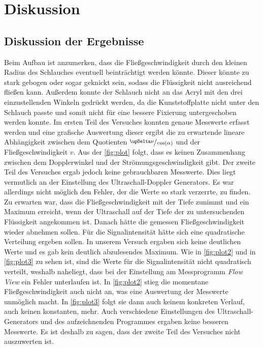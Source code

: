 \section{Diskussion}
\label{sec:Diskussion}

\subsection{Diskussion der Ergebnisse}
\label{subsec:diskErg}
Beim Aufbau ist anzumerken, dass die Fließgeschwindigkeit durch den kleinen Radius des Schlauches eventuell beinträchtigt werden könnte.
Dieser könnte zu stark gebogen oder sogar geknickt sein, sodass die Flüssigkeit nicht ausreichend fließen kann.
Außerdem konnte der Schlauch nicht an das Acryl mit den drei einzustellenden Winkeln gedrückt werden, da die Kunststoffplatte nicht 
unter den Schlauch passte und somit nicht für eine bessere Fixierung untergeschoben werden konnte.\newline
Im ersten Teil des Versuches konnten genaue Messwerte erfasst werden und eine grafische Auswertung dieser ergibt die zu erwartende lineare Abhängigkeit
zwischen dem Quotienten $\sfrac{\upDelta\nu}{\cos(\alpha)}$ und der Fließgeschwindigkeit $v$.
Aus der \autoref{fig:plot} folgt, dass es keinen Zusammenhang zwischen dem Dopplerwinkel und der Strömungsgeschwindigkeit gibt.\newline
Der zweite Teil des Versuches ergab jedoch keine gebrauchbaren Messwerte. Dies liegt vermutlich an der Einstellung des Ultraschall-Doppler Generators.
Es war allerdings nicht möglich den Fehler, der die Werte so stark verzerrte, zu finden. Zu erwarten war, dass die Fließgeschwindigkeit mit der Tiefe zunimmt
und ein Maximum erreicht, wenn der Ultraschall auf der Tiefe der zu untersuchenden Flüssigkeit angekommen ist. Danach hätte die gemessen 
Fließgeschwindigkeit wieder abnehmen sollen. Für die Signalintensität hätte sich eine quadratische Verteilung ergeben sollen.\newline
In unserem Versuch ergaben sich keine deutlichen Werte und es gab kein deutlich abzulesendes Maximum. Wie in \autoref{fig:plot2} und in \autoref{fig:plot3} zu sehen ist, sind
die Werte für die Signalintensität nicht quadratisch verteilt, weshalb naheliegt, dass bei der Einstellung am Messprogramm \textit{Flow View} ein Fehler unterlaufen ist.
In \autoref{fig:plot2} stieg die momentane Fließgeschwindigkeit auch nicht an, was eine Auswertung der Messwerte unmöglich macht. In \autoref{fig:plot3} folgt sie dann auch keinem 
konkreten Verlauf, auch keinen konstanten, mehr. Auch verschiedene Einstellungen des Ultraschall-Generators und des aufzeichnenden Programmes ergaben keine besseren Messwerte.
Es ist deshalb zu sagen, dass der zweite Teil des Versuches nicht auszuwerten ist.\newline

